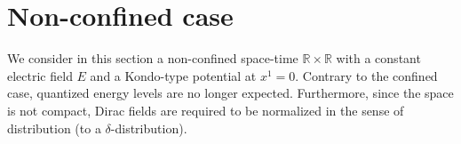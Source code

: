 \section{Non-confined case}\label{vacuum-without_bdy}
We consider in this section a non-confined space-time $\mathbb{R}\times\mathbb{R}$ with a constant electric field $E$ and a Kondo-type potential at $x^1 = 0$.
Contrary to the confined case, quantized energy levels are no longer expected. 
Furthermore, since the space is not compact, Dirac fields are required to be normalized in the sense of distribution (to a $\delta$-distribution).  

%
